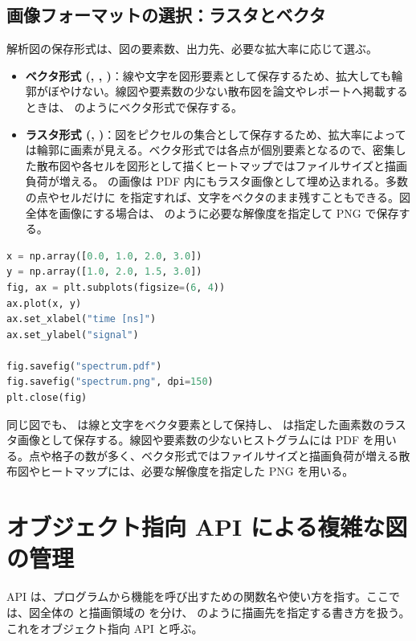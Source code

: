 \subsection{画像フォーマットの選択：ラスタとベクタ}

解析図の保存形式は、図の要素数、出力先、必要な拡大率に応じて選ぶ。

\begin{itemize}
    \item \textbf{ベクタ形式 (, , )}：線や文字を図形要素として保存するため、拡大しても輪郭がぼやけない。線図や要素数の少ない散布図を論文やレポートへ掲載するときは、 のようにベクタ形式で保存する。
    \item \textbf{ラスタ形式 (, )}：図をピクセルの集合として保存するため、拡大率によっては輪郭に画素が見える。ベクタ形式では各点が個別要素となるので、密集した散布図や各セルを図形として描くヒートマップではファイルサイズと描画負荷が増える。 の画像は PDF 内にもラスタ画像として埋め込まれる。多数の点やセルだけに  を指定すれば、文字をベクタのまま残すこともできる。図全体を画像にする場合は、 のように必要な解像度を指定して PNG で保存する。
\end{itemize}

\begin{lstlisting}[language=Python]
x = np.array([0.0, 1.0, 2.0, 3.0])
y = np.array([1.0, 2.0, 1.5, 3.0])
fig, ax = plt.subplots(figsize=(6, 4))
ax.plot(x, y)
ax.set_xlabel("time [ns]")
ax.set_ylabel("signal")

fig.savefig("spectrum.pdf")
fig.savefig("spectrum.png", dpi=150)
plt.close(fig)
\end{lstlisting}

同じ図でも、 は線と文字をベクタ要素として保持し、 は指定した画素数のラスタ画像として保存する。線図や要素数の少ないヒストグラムには PDF を用いる。点や格子の数が多く、ベクタ形式ではファイルサイズと描画負荷が増える散布図やヒートマップには、必要な解像度を指定した PNG を用いる。


\section{オブジェクト指向 API による複雑な図の管理}\label{sec:matplotlib-object}

API は、プログラムから機能を呼び出すための関数名や使い方を指す。ここでは、図全体の  と描画領域の  を分け、 のように描画先を指定する書き方を扱う。これをオブジェクト指向 API と呼ぶ。

